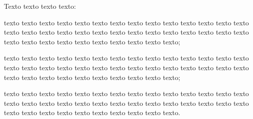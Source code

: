 Texto texto texto texto:
\begin{alineas}
    \item texto texto texto texto texto texto texto texto texto texto texto texto texto texto texto texto texto texto texto texto texto texto texto texto texto texto texto texto texto texto texto texto texto texto texto texto texto texto;
    \item texto texto texto texto texto texto texto texto texto texto texto texto texto texto texto texto texto texto texto texto texto texto texto texto texto texto texto texto texto texto texto texto texto texto texto texto texto texto; 
    \item texto texto texto texto texto texto texto texto texto texto texto texto texto texto texto texto texto texto texto texto texto texto texto texto texto texto texto texto texto texto texto texto texto texto texto texto texto texto.
\end{alineas}
